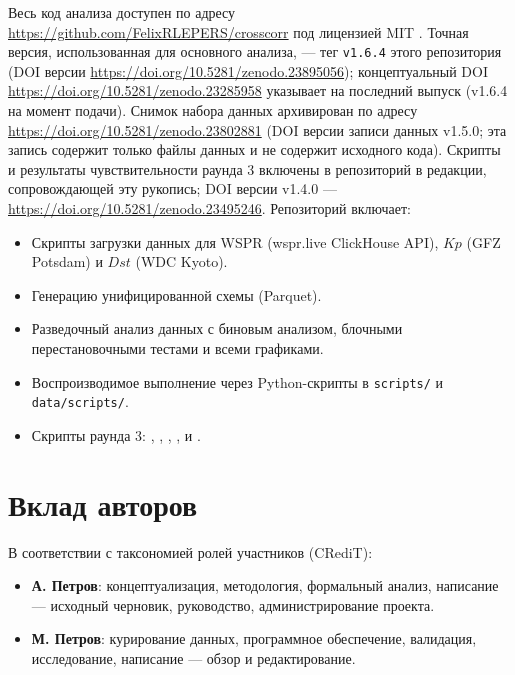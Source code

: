 \documentclass{agujournal2019}
\begin{document}
Весь код анализа доступен по адресу
\url{https://github.com/FelixRLEPERS/crosscorr}
под лицензией MIT \citep{crosscorr_code}. Точная версия, использованная для
основного анализа, — тег \texttt{v1.6.4} этого репозитория (DOI версии
\url{https://doi.org/10.5281/zenodo.23895056}); концептуальный DOI
\url{https://doi.org/10.5281/zenodo.23285958} указывает на последний
выпуск (v1.6.4 на момент подачи). Снимок набора данных
архивирован по адресу
\url{https://doi.org/10.5281/zenodo.23802881} (DOI версии записи
данных v1.5.0; эта запись содержит только файлы данных и не содержит
исходного кода). Скрипты и результаты чувствительности раунда 3 включены в
репозиторий в редакции, сопровождающей эту рукопись; DOI версии
v1.4.0 — \url{https://doi.org/10.5281/zenodo.23495246}.
Репозиторий включает:

{\sloppy
\begin{itemize}
	\item Скрипты загрузки данных для WSPR (wspr.live ClickHouse API),
	      $Kp$ (GFZ Potsdam) и $Dst$ (WDC Kyoto).
	\item Генерацию унифицированной схемы (Parquet).
	\item Разведочный анализ данных с биновым анализом, блочными
	      перестановочными тестами и всеми графиками.
	\item Воспроизводимое выполнение через Python-скрипты в
	      \texttt{scripts/} и \texttt{data/scripts/}.
	\item Скрипты раунда 3: ,
	      ,
	      ,
	      ,
	       и
	      .
\end{itemize}
\par}


\section*{Вклад авторов}

В соответствии с таксономией ролей участников (CRediT):
\begin{itemize}
	\item \textbf{А. Петров}: концептуализация, методология, формальный
	      анализ, написание — исходный черновик, руководство,
	      администрирование проекта.
	\item \textbf{М. Петров}: курирование данных, программное обеспечение,
	      валидация, исследование, написание — обзор и редактирование.
\end{itemize}
\end{document}
